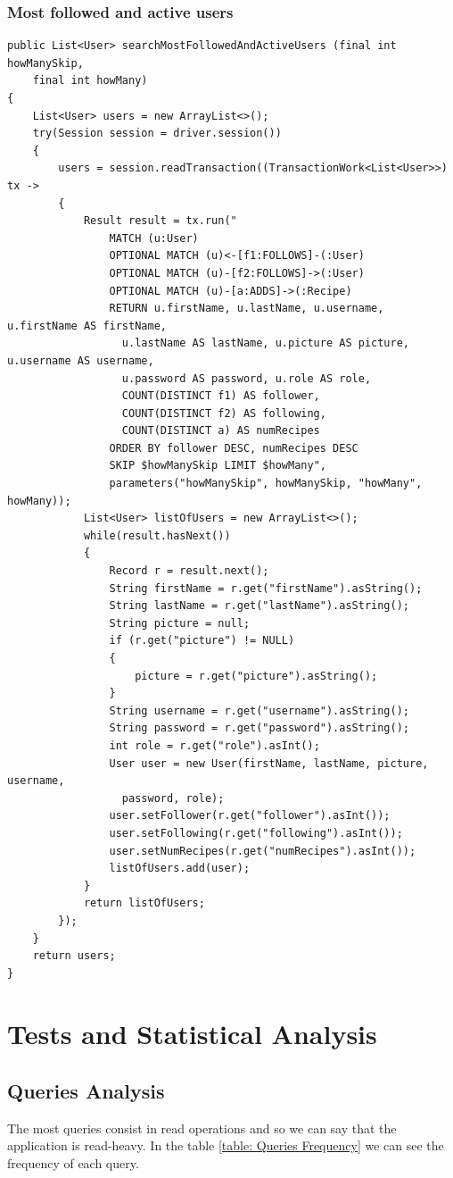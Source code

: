 \documentclass[a4paper]{report}
\begin{document}
\subsubsection{Most followed and active users}
\lstset{language=code}
\begin{lstlisting}
public List<User> searchMostFollowedAndActiveUsers (final int howManySkip, 
	final int howMany)
{
	List<User> users = new ArrayList<>();
	try(Session session = driver.session())
	{
		users = session.readTransaction((TransactionWork<List<User>>)  tx -> 
		{
			Result result = tx.run("
				MATCH (u:User) 
				OPTIONAL MATCH (u)<-[f1:FOLLOWS]-(:User) 
				OPTIONAL MATCH (u)-[f2:FOLLOWS]->(:User) 
				OPTIONAL MATCH (u)-[a:ADDS]->(:Recipe) 
				RETURN u.firstName, u.lastName, u.username, u.firstName AS firstName, 
				  u.lastName AS lastName, u.picture AS picture, u.username AS username, 
				  u.password AS password, u.role AS role, 
				  COUNT(DISTINCT f1) AS follower, 
				  COUNT(DISTINCT f2) AS following, 
				  COUNT(DISTINCT a) AS numRecipes 
				ORDER BY follower DESC, numRecipes DESC 
				SKIP $howManySkip LIMIT $howMany",
				parameters("howManySkip", howManySkip, "howMany", howMany));
			List<User> listOfUsers = new ArrayList<>();
			while(result.hasNext())
			{
				Record r = result.next();
				String firstName = r.get("firstName").asString();
				String lastName = r.get("lastName").asString();
				String picture = null;
				if (r.get("picture") != NULL)
				{
					picture = r.get("picture").asString();
				}
				String username = r.get("username").asString();
				String password = r.get("password").asString();
				int role = r.get("role").asInt();
				User user = new User(firstName, lastName, picture, username, 
				  password, role);
				user.setFollower(r.get("follower").asInt());
				user.setFollowing(r.get("following").asInt());
				user.setNumRecipes(r.get("numRecipes").asInt());
				listOfUsers.add(user);
			}
			return listOfUsers;
		});
	}
	return users;
}
\end{lstlisting}

\newpage
\section{Tests and Statistical Analysis}
\subsection{Queries Analysis}
The most queries consist in read operations and so we can say that the application is read-heavy. In the table \ref{table: Queries Frequency} we can see the frequency of each query. 
\end{document}
